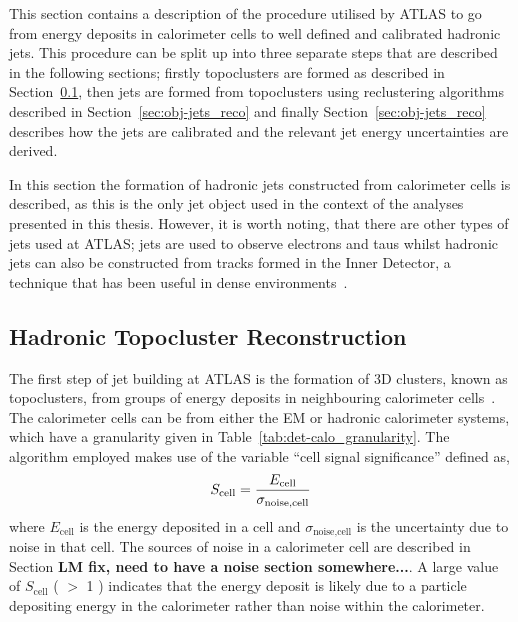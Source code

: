 This section contains a description of the procedure utilised by ATLAS
to go from energy deposits in calorimeter cells to well defined and calibrated hadronic jets.
This procedure can be split up into three separate steps that are described in the following sections;
firstly topoclusters are formed as described in Section~\ref{sec:obj-jets_topo},
then jets are formed from topoclusters using reclustering algorithms described in Section~\ref{sec:obj-jets_reco}
and finally Section~\ref{sec:obj-jets_reco} describes how the jets are calibrated and the relevant jet energy uncertainties are derived.

In this section the formation of hadronic jets constructed from calorimeter cells is described,
as this is the only jet object used in the context of the analyses presented in this thesis.
However, it is worth noting, that there are other types of jets used at ATLAS;
jets are used to observe electrons and taus whilst
hadronic jets can also be constructed from tracks formed in the Inner Detector, a technique that has been useful in dense environments~\cite{obj-Hbb}.

\subsection{Hadronic Topocluster Reconstruction}
\label{sec:obj-jets_topo}

The first step of jet building at ATLAS is the formation of 3D clusters, known as topoclusters, from groups of energy deposits in neighbouring calorimeter cells~\cite{obj-jets_topo}.
The calorimeter cells can be from either the EM or hadronic calorimeter systems,
which have a granularity given in Table~\ref{tab:det-calo_granularity}.
The algorithm employed makes use of the variable ``cell signal significance'' defined as, 
\begin{equation}
  \Large{S_{\text{cell}} = \frac{E_{\text{cell}}}{\sigma_{\text{noise,cell}}}}
\end{equation}
where $E_{\text{cell}}$ is the energy deposited in a cell
and $\sigma_{\text{noise,cell}}$ is the uncertainty due to noise in that cell.
The sources of noise in a calorimeter cell are described in Section \textbf{LM fix, need to have a noise section somewhere...}.
A large value of $S_{\text{cell}}$ ( $>$ 1 ) indicates that the energy deposit is likely due to a particle
depositing energy in the calorimeter rather than noise within the calorimeter.

